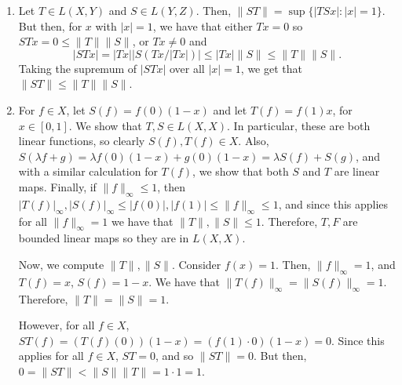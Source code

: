 \documentclass[11pt]{article}
\begin{document}
\begin{enumerate}[label=\arabic*., leftmargin=*, itemsep=10pt]
\begin{enumerate}
        Next, for $\lambda \in \mathbb{K}$,
        \[
        \|\lambda T\| = \sup \{|\lambda T(x)| : |x| = 1 \} = \sup \{ |\lambda| |T(x)| : |x| = 1\} = |\lambda| \sup \{ |T(x)| : |x| = 1\} = |\lambda| \| T\|   
        .\] 

        Finally, for the triangle inequality, let $|x| = 1$. Then,
        \begin{align*}
            |(T + S)(x)| = |T(x) + S(x)| \leq |T(x)| + |S(x)| \leq \|T\| + \|S\|
        .\end{align*}
        The last inequality follows from the definition of the operator norm because $|x| = 1$.
        Taking the supremum of $|(T + S)(x)|$ over all such $|x|=1$, we get that $\|T + S\| \leq \|T\| + \|S\|$.
    \item Let $T \in L(X, Y)$ and $S \in L(Y, Z)$.
        Then, $\| ST\| = \sup \{|TS x| : | x | = 1\} $.
        But then, for $x$ with $|x| = 1$, we have that either $Tx = 0$ so $STx = 0 \leq \|T\|\|S\|$, or $Tx \neq 0$ and
        \[
            |ST x| = |Tx| |S(Tx / |Tx|)| \leq |Tx| \|S\| \leq \|T\|\|S\|
        .\] 
        Taking the supremum of $|ST x|$ over all $|x|=1$, we get that $\|ST\| \leq \|T\|\|S\|$.
    \item For $f \in X$, let $S(f) = f(0)(1 - x)$ and let $T(f) = f(1)x$, for $x \in [0, 1]$. We show that $T, S \in L(X, X)$.
        In particular, these are both linear functions, so clearly $S(f), T(f) \in X$.
        Also, $S(\lambda f + g) = \lambda f(0)(1 - x) + g(0)(1 - x) = \lambda S(f) + S(g)$, and with a similar calculation for $T(f)$, we show that both $S$ and $T$ are linear maps.
        Finally, if $\|f\|_{\infty} \leq 1$, then $|T(f)|_{\infty}, |S(f)|_{\infty} \leq |f(0)|, |f(1)| \leq \|f\|_{\infty} \leq 1$, and since this applies for all $\|f\|_{\infty} = 1$ we have that $\|T\|, \|S\| \leq 1$. Therefore, $T, F$ are bounded linear maps so they are in $L(X, X)$.

        Now, we compute $\|T\|, \|S\|$.
        Consider $f(x) = 1$.
        Then, $\|f\|_{\infty} = 1$, and $T(f) = x$, $S(f) = 1 - x$.
        We have that $\|T(f)\|_{\infty} = \|S(f)\|_{\infty} = 1$.
        Therefore, $\|T\| = \|S\| = 1$.

        However, for all $f \in X$, $ST(f) = (T(f)(0))(1 - x) = (f(1)\cdot 0)(1 - x) = 0$.
        Since this applies for all $f \in X$, $ST = 0$, and so $\|ST\| =0$.
        But then, $0=\|ST\| < \|S\|\|T\| = 1 \cdot  1 = 1$.
\end{enumerate}


\end{enumerate}
\end{document}
